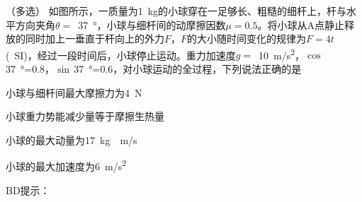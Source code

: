 （多选）
如图所示，一质量为\qty{1}{\kg}的小球穿在一足够长、粗糙的细杆上，杆与水平方向夹角\(\theta =\) \,\qty{37}{\degree}，小球与细杆间的动摩擦因数\(\mu = 0.5\)。将小球从A点静止释放的同时加上一垂直于杆向上的外力\(F\)，\(F\)的大小随时间变化的规律为\(F = 4t\) (\qty{}{SI})，经过一段时间后，小球停止运动。重力加速度\(g =\) \,\qty{10}{m/s^2}，\(\cos\) \,\qty{37}{\degree}=0.8，\(\sin\)\,\qty{37}{\degree}=0.6，对小球运动的全过程，下列说法正确的是\paren[]

\begin{choices}
	\item 小球与细杆间最大摩擦力为\qty{4}{N}
	\item 小球重力势能减少量等于摩擦生热量
	\item 小球的最大动量为\qty{17}{kg\cdot m/s}
	\item 小球的最大加速度为\qty{6}{m/s^2}
\end{choices}
\begin{answer}
	BD\qquad 提示：
\end{answer}